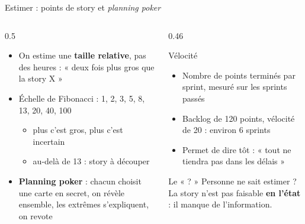 \documentclass[aspectratio=169,10pt]{beamer}
\begin{document}
\begin{frame}{Estimer : points de story et \textit{planning poker}}
  \begin{columns}[T]
    \begin{column}{0.5\textwidth}
      \begin{itemize}
        \item On estime une \textbf{taille relative}, pas des heures : « deux fois plus gros que la story X »
        \item Échelle de Fibonacci : 1, 2, 3, 5, 8, 13, 20, 40, 100
          \begin{itemize}
            \item plus c'est gros, plus c'est incertain
            \item au-delà de 13 : story à découper
          \end{itemize}
        \item \textbf{Planning poker} : chacun choisit une carte en secret, on révèle ensemble, les extrêmes s'expliquent, on revote
      \end{itemize}
    \end{column}
    \begin{column}{0.46\textwidth}
      \begin{block}{Vélocité}
        \begin{itemize}
          \item Nombre de points terminés par sprint, mesuré sur les sprints passés
          \item Backlog de 120 points, vélocité de 20 : environ 6 sprints
          \item Permet de dire tôt : « tout ne tiendra pas dans les délais »
        \end{itemize}
      \end{block}
      \begin{alertblock}{Le « ? »}
        Personne ne sait estimer ? La story n'est pas faisable \textbf{en l'état} : il manque de l'information.
      \end{alertblock}
    \end{column}
  \end{columns}
\end{frame}
\end{document}
